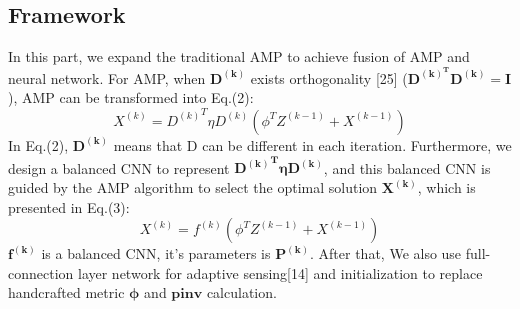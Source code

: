 \documentclass[conference]{IEEEtran}
\begin{document}
\subsection{Framework}
In this part, we expand the traditional AMP to achieve fusion of AMP and neural network. For AMP, when $\bm{D^{(k)}}$ exists orthogonality [25] ($\bm{D^{(k)^T}D^{(k)}=I}$), AMP can be transformed into Eq.(2):
 \begin{equation}
X^{(k)}={D^{(k)}}^{T}\eta D^{(k)}(\phi^T Z^{(k-1)}+X^{(k-1)}) 
\end{equation}
In Eq.(2), $\bm{D^{(k)}}$ means that D can be different in each iteration. Furthermore, we design a balanced CNN to represent $\bm{{D^{(k)}}^{T}\eta D^{(k)}}$, and this balanced CNN is guided by the AMP algorithm to select the optimal solution $\bm{X^{(k)}}$, which is presented in Eq.(3):
\begin{equation}
X^{(k)}=f^{(k)}(\phi^T Z^{(k-1)}+X^{(k-1)})  
\end{equation}
$\bm{f^{(k)}}$ is a balanced CNN, it’s parameters is $\bm{P^{(k) }}$. After that, We also use full-connection layer network for adaptive sensing[14] and initialization to replace handcrafted metric $\bm{\phi}$ and $\bm{pinv}$ calculation.
\end{document}
